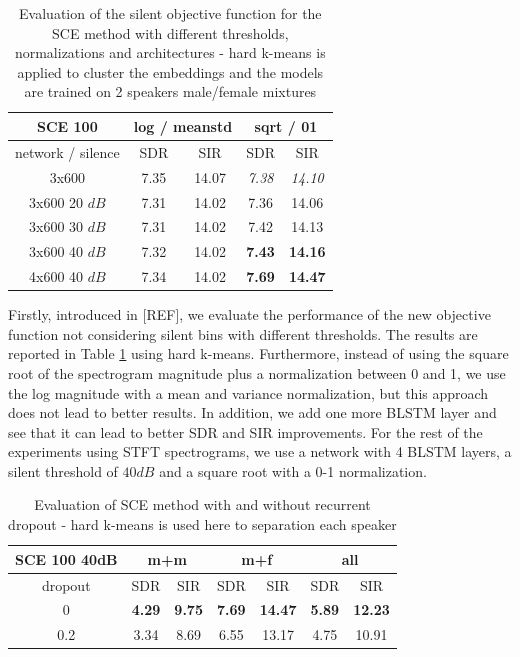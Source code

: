 \documentclass[master, tikz, final,11pt, dvipdfmx]{iscs-thesis}
\begin{document}
\begin{table}[ht]
\centering
\begin{tabular}{c|c|c|c|c}
SCE 100 & \multicolumn{2}{c|}{log / meanstd } & \multicolumn{2}{c}{sqrt / 01} \\ 
\hline 
network / silence & SDR & SIR & SDR & SIR  \\ 
\hline 
3x600 & 7.35 & 14.07 & \textit{7.38} & \textit{14.10} \\ 
\hline 
\hline 
3x600 20 $dB$ & 7.31 & 14.02 & 7.36 & 14.06 \\ 
3x600 30 $dB$ & 7.31 & 14.02 & 7.42 & 14.13 \\ 
3x600 40 $dB$ & 7.32 & 14.02 & \textbf{7.43} & \textbf{14.16} \\ 
4x600 40 $dB$ & 7.34 & 14.02 & \cellcolor{green}\textbf{7.69} & \cellcolor{green}\textbf{14.47} \\ 
\end{tabular}
\captionsetup{justification=centering}
\caption{Evaluation of the silent objective function for the SCE method with different thresholds, normalizations and architectures - hard k-means is applied to cluster the embeddings and the models are trained on 2 speakers male/female mixtures}
\label{table:SCEsilence}
\end{table}

Firstly, introduced in [REF], we evaluate the performance of the new objective function not considering silent bins with different thresholds. The results are reported in Table \ref{table:SCEsilence} using hard k-means. Furthermore, instead of using the square root of the spectrogram magnitude plus a normalization between 0 and 1, we use the log magnitude with a mean and variance normalization, but this approach does not lead to better results. In addition, we add one more BLSTM layer and see that it can lead to better SDR and SIR improvements. For the rest of the experiments using STFT spectrograms, we use a network with 4 BLSTM layers, a silent threshold of $40dB$ and a square root with a 0-1 normalization. 

\begin{table}[ht]
\centering
\begin{tabular}{c|c|c|c|c|c|c}
SCE 100 40dB & \multicolumn{2}{c|}{m+m} & \multicolumn{2}{c|}{m+f} & \multicolumn{2}{c}{all} \\ 
\hline 
dropout & SDR & SIR & SDR & SIR & SDR & SIR  \\ 
\hline 
0 & \textbf{4.29} & \textbf{9.75} & \textbf{7.69} & \textbf{14.47} & \textbf{5.89} & \textbf{12.23} \\ 
0.2 & 3.34 & 8.69 &  6.55 & 13.17 & 4.75 & 10.91 \\ 
\end{tabular}
\captionsetup{justification=centering}
\caption{Evaluation of SCE method with and without recurrent dropout - hard k-means is used here to separation each speaker}
\label{table:SCE100drop}
\end{table}
\end{document}
